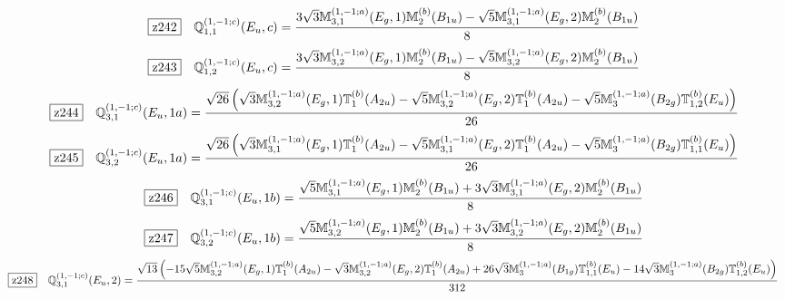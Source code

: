 \documentclass[fleqn,10pt,landscape]{jsarticle}
\begin{document}
\begin{dmath*}
\hspace*{3mm}\fbox{z242}\quad \mathbb{Q}_{1,1}^{(1,-1;c)}(E_{u},c)=\frac{3 \sqrt{3} \mathbb{M}_{3,1}^{(1,-1;a)}(E_{g},1) \mathbb{M}_{2}^{(b)}(B_{1u}) - \sqrt{5} \mathbb{M}_{3,1}^{(1,-1;a)}(E_{g},2) \mathbb{M}_{2}^{(b)}(B_{1u})}{8}
\end{dmath*}
\begin{dmath*}
\hspace*{3mm}\fbox{z243}\quad \mathbb{Q}_{1,2}^{(1,-1;c)}(E_{u},c)=\frac{3 \sqrt{3} \mathbb{M}_{3,2}^{(1,-1;a)}(E_{g},1) \mathbb{M}_{2}^{(b)}(B_{1u}) - \sqrt{5} \mathbb{M}_{3,2}^{(1,-1;a)}(E_{g},2) \mathbb{M}_{2}^{(b)}(B_{1u})}{8}
\end{dmath*}
\begin{dmath*}
\hspace*{3mm}\fbox{z244}\quad \mathbb{Q}_{3,1}^{(1,-1;c)}(E_{u},1a)=\frac{\sqrt{26} \left(\sqrt{3} \mathbb{M}_{3,2}^{(1,-1;a)}(E_{g},1) \mathbb{T}_{1}^{(b)}(A_{2u}) - \sqrt{5} \mathbb{M}_{3,2}^{(1,-1;a)}(E_{g},2) \mathbb{T}_{1}^{(b)}(A_{2u}) - \sqrt{5} \mathbb{M}_{3}^{(1,-1;a)}(B_{2g}) \mathbb{T}_{1,2}^{(b)}(E_{u})\right)}{26}
\end{dmath*}
\begin{dmath*}
\hspace*{3mm}\fbox{z245}\quad \mathbb{Q}_{3,2}^{(1,-1;c)}(E_{u},1a)=\frac{\sqrt{26} \left(\sqrt{3} \mathbb{M}_{3,1}^{(1,-1;a)}(E_{g},1) \mathbb{T}_{1}^{(b)}(A_{2u}) - \sqrt{5} \mathbb{M}_{3,1}^{(1,-1;a)}(E_{g},2) \mathbb{T}_{1}^{(b)}(A_{2u}) - \sqrt{5} \mathbb{M}_{3}^{(1,-1;a)}(B_{2g}) \mathbb{T}_{1,1}^{(b)}(E_{u})\right)}{26}
\end{dmath*}
\begin{dmath*}
\hspace*{3mm}\fbox{z246}\quad \mathbb{Q}_{3,1}^{(1,-1;c)}(E_{u},1b)=\frac{\sqrt{5} \mathbb{M}_{3,1}^{(1,-1;a)}(E_{g},1) \mathbb{M}_{2}^{(b)}(B_{1u}) + 3 \sqrt{3} \mathbb{M}_{3,1}^{(1,-1;a)}(E_{g},2) \mathbb{M}_{2}^{(b)}(B_{1u})}{8}
\end{dmath*}
\begin{dmath*}
\hspace*{3mm}\fbox{z247}\quad \mathbb{Q}_{3,2}^{(1,-1;c)}(E_{u},1b)=\frac{\sqrt{5} \mathbb{M}_{3,2}^{(1,-1;a)}(E_{g},1) \mathbb{M}_{2}^{(b)}(B_{1u}) + 3 \sqrt{3} \mathbb{M}_{3,2}^{(1,-1;a)}(E_{g},2) \mathbb{M}_{2}^{(b)}(B_{1u})}{8}
\end{dmath*}
\begin{dmath*}
\hspace*{3mm}\fbox{z248}\quad \mathbb{Q}_{3,1}^{(1,-1;c)}(E_{u},2)=\frac{\sqrt{13} \left(- 15 \sqrt{5} \mathbb{M}_{3,2}^{(1,-1;a)}(E_{g},1) \mathbb{T}_{1}^{(b)}(A_{2u}) - \sqrt{3} \mathbb{M}_{3,2}^{(1,-1;a)}(E_{g},2) \mathbb{T}_{1}^{(b)}(A_{2u}) + 26 \sqrt{3} \mathbb{M}_{3}^{(1,-1;a)}(B_{1g}) \mathbb{T}_{1,1}^{(b)}(E_{u}) - 14 \sqrt{3} \mathbb{M}_{3}^{(1,-1;a)}(B_{2g}) \mathbb{T}_{1,2}^{(b)}(E_{u})\right)}{312}
\end{dmath*}
\end{document}
